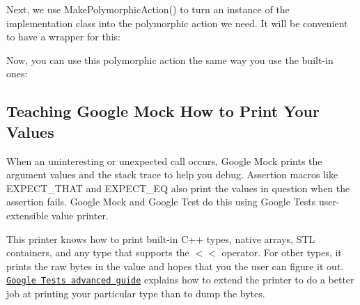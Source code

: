 Next, we use {\ttfamily Make\+Polymorphic\+Action()} to turn an instance of the implementation class into the polymorphic action we need. It will be convenient to have a wrapper for this\+:


\begin{DoxyCode}{0}
\DoxyCodeLine{}
\DoxyCodeLine{\}}
\end{DoxyCode}


Now, you can use this polymorphic action the same way you use the built-\/in ones\+:


\begin{DoxyCode}{0}
\DoxyCodeLine{}
\DoxyCodeLine{\};}
\DoxyCodeLine{}
\end{DoxyCode}


\subsection*{Teaching Google Mock How to Print Your Values}

When an uninteresting or unexpected call occurs, Google Mock prints the argument values and the stack trace to help you debug. Assertion macros like {\ttfamily E\+X\+P\+E\+C\+T\+\_\+\+T\+H\+AT} and {\ttfamily E\+X\+P\+E\+C\+T\+\_\+\+EQ} also print the values in question when the assertion fails. Google Mock and Google Test do this using Google Test\textquotesingle{}s user-\/extensible value printer.

This printer knows how to print built-\/in C++ types, native arrays, S\+TL containers, and any type that supports the {\ttfamily $<$$<$} operator. For other types, it prints the raw bytes in the value and hopes that you the user can figure it out. \href{../../googletest/docs/advanced.md#teaching-google-test-how-to-print-your-values}{\tt Google Test\textquotesingle{}s advanced guide} explains how to extend the printer to do a better job at printing your particular type than to dump the bytes. 